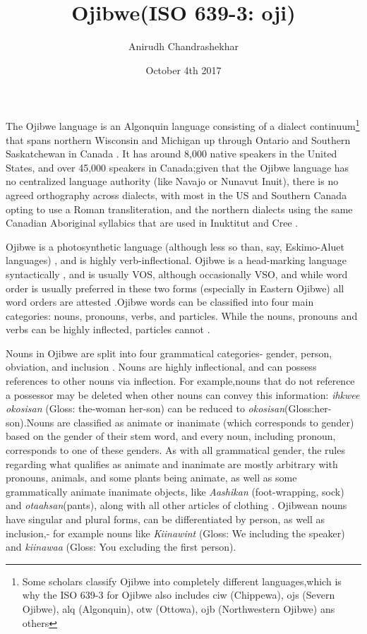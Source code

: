 \documentclass{report}
\title{Ojibwe(ISO 639-3: oji)}
\author{Anirudh Chandrashekhar}
\date{October 4th 2017}
\begin{document}
\maketitle
The Ojibwe language is an Algonquin language consisting of a dialect continuum\footnote{Some scholars classify Ojibwe into completely different languages,which is why the ISO 639-3 for Ojibwe also includes ciw (Chippewa), ojs (Severn Ojibwe), alq (Algonquin), otw (Ottowa), ojb (Northwestern Ojibwe) ans others} that spans northern Wisconsin and Michigan up through Ontario and Southern Saskatchewan in Canada \citep{bloomfield2016eastern}. It has around 8,000 native speakers in the United States, and over 45,000 speakers in Canada;given that the Ojibwe language has no centralized language authority (like Navajo or Nunavut Inuit), there is no agreed orthography across dialects, with most in the US and Southern Canada opting to use a Roman transliteration, and the northern dialects using the same Canadian Aboriginal syllabics that are used in Inuktitut and Cree \citep{bloomfield2016eastern}.

Ojibwe is a photosynthetic language (although less so than, say, Eskimo-Aluet languages) , and is highly verb-inflectional. Ojibwe is a head-marking language syntactically , and is usually VOS, although occasionally VSO, and while word order is usually preferred in these two forms (especially in Eastern Ojibwe) all word orders are attested \citep{bloomfield2016eastern}.Ojibwe words can be classified into four main categories: nouns, pronouns, verbs, and particles. While the nouns, pronouns and verbs can be highly inflected, particles cannot \citep{wiscgrammar}.

Nouns in Ojibwe are split into four grammatical categories- gender, person, obviation, and inclusion \citep{todd1970grammar}. Nouns are highly inflectional, and can possess references to other nouns via inflection. For example,nouns that do not reference a possessor may be deleted when other nouns can convey this information: \emph{ihkwee okosisan} (Gloss: the-woman  her-son) can be reduced to \emph{okosisan}(Gloss:her-son).Nouns are classified as animate or inanimate (which corresponds to gender) based on the gender of their stem word, and every noun, including pronoun, corresponds to one of these genders. As with all grammatical gender, the rules regarding what qualifies as animate and inanimate are mostly arbitrary with pronouns, animals, and some plants being animate, as well as some grammatically animate inanimate objects, like \emph{Aashikan} (foot-wrapping, sock) and \emph{otaahsan}(pants), along with all other articles of clothing \citep{bloomfield2016eastern}. Ojibwean nouns have singular and plural forms, can be differentiated by person, as well as inclusion,- for example nouns like \emph{Kiinawint} (Gloss: We including the speaker) and \emph{kiinawaa} (Gloss: You excluding the first person).
\end{document}
